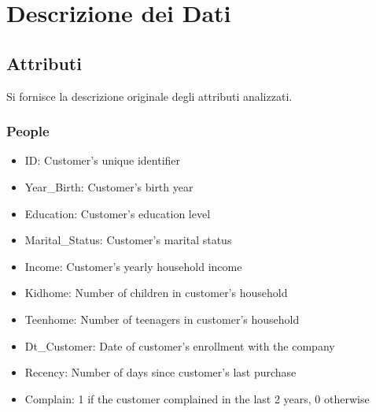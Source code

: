 \documentclass[letterpaper,11pt]{article}
\begin{document}


\section{Descrizione dei Dati}


\subsection{Attributi}
Si fornisce la descrizione originale degli attributi analizzati.
\subsubsection*{People}
\begin{itemize}
    \item ID: Customer's unique identifier
    \item Year\_Birth: Customer's birth year
    \item Education: Customer's education level
    \item Marital\_Status: Customer's marital status
    \item Income: Customer's yearly household income
    \item Kidhome: Number of children in customer's household
    \item Teenhome: Number of teenagers in customer's household
    \item Dt\_Customer: Date of customer's enrollment with the company
    \item Recency: Number of days since customer's last purchase
    \item Complain: 1 if the customer complained in the last 2 years, 0 otherwise
\end{itemize}
\end{document}
